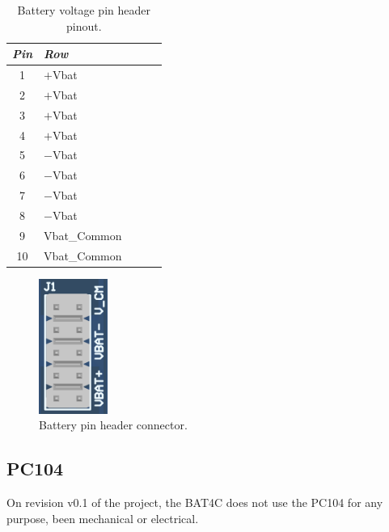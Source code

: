 \begin{table}[!h]
    \centering
    \begin{tabular}{cllll}
        \toprule[1.5pt]
        \textit{Pin} & \textit{Row} \\
        \midrule
        1            & $+$Vbat \\
        2            & $+$Vbat \\
        3            & $+$Vbat \\
        4            & $+$Vbat \\
        5            & $-$Vbat \\
        6            & $-$Vbat \\
        7            & $-$Vbat \\
        8            & $-$Vbat \\
        9            & Vbat\_Common \\
        10           & Vbat\_Common \\
        \bottomrule[1.5pt]
    \end{tabular}
    \caption{Battery voltage pin header pinout.}
    \label{tab:battery-pin-header}
\end{table}

\begin{figure}[!ht]
    \begin{center}
        \includegraphics[width=0.2\textwidth]{figures/battery-pin-header.png}
        \caption{Battery pin header connector.}
        \label{fig:battery-pin-header}
    \end{center}
\end{figure}

\subsection{PC104}

On revision v0.1 of the project, the BAT4C does not use the PC104 for any purpose, been mechanical or electrical.

